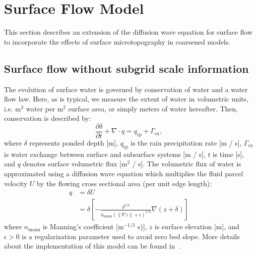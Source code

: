 \documentclass[review,11pt]{elsarticle}
\begin{document}
\FloatBarrier

%
\section{Surface Flow Model}\label{surf-flow-system}
This section describes an extension of the diffusion wave equation for surface flow to incorporate the effects of surface microtopography in coarsened models.

%
\subsection{Surface flow without subgrid scale information}
The evolution of surface water is governed by conservation of water and a water flow law.
Here, as is typical, we measure the extent of water in volumetric units, i.e. m$^3$ water per m$^2$ surface area, or simply meters of water hereafter.
Then, conservation is described by:
%
\begin{equation}\label{diffwaveeq}
\frac{\partial \delta}{\partial t} + \nabla \cdot q = q_\text{rp} + \Gamma_\text{ex},
\end{equation}
%
where $\delta$ represents ponded depth [m], $q_\text{rp}$ is the rain precipitation rate [m / s], $\Gamma_\text{ex}$ is water exchange between surface and subsurface systems [m / s], $t$ is time [s], and $q$ denotes surface volumetric flux [m$^2$ / s].
The volumetric flux of water is approximated using a diffusion wave equation which multiplies the fluid parcel velocity $U$ by the flowing cross sectional area (per unit edge length):
%
\begin{align}
\label{diffwaveeq_flowlaw}
q &= \delta U \nonumber\\
  &= \delta \left[ -\frac{\delta^{2/3}}{n_\text{mann} (\| \nabla z\| +\epsilon)^{1/2}} \nabla(z + \delta) \right]
\end{align}
%
where $n_\text{mann}$ is Manning's coefficient [m$^{-1/3}$ s)], $z$ is surface elevation [m], and $\epsilon >0$ is a regularization parameter used to avoid zero bed slope.
More details about the implementation of this model  can be found in~\cite{spainter2016integrated}. 

%
\end{document}
